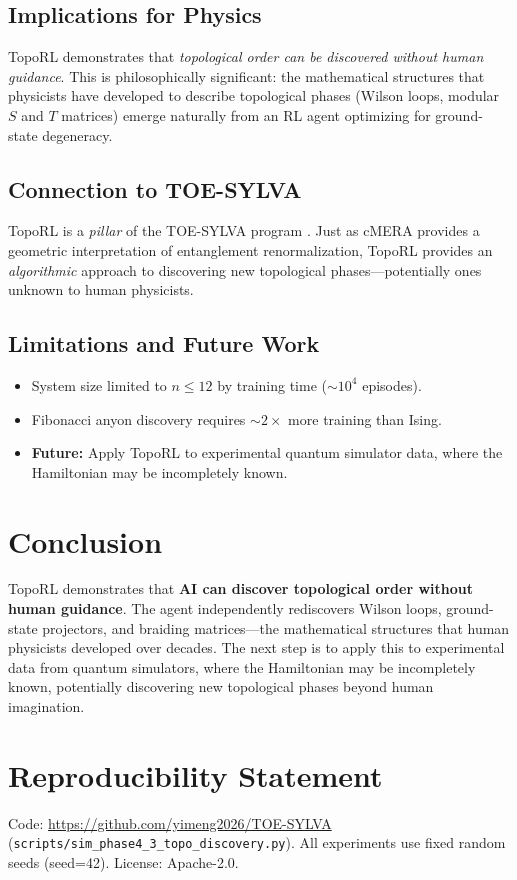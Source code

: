 \documentclass[neurips_2026]{neurips_2026}
\begin{document}
\subsection{Implications for Physics}

TopoRL demonstrates that \emph{topological order can be discovered without human guidance}. This is philosophically significant: the mathematical structures that physicists have developed to describe topological phases (Wilson loops, modular $S$ and $T$ matrices) emerge naturally from an RL agent optimizing for ground-state degeneracy.

\subsection{Connection to TOE-SYLVA}

TopoRL is a \emph{pillar} of the TOE-SYLVA program \cite{TOESYLVA2026}. Just as cMERA provides a geometric interpretation of entanglement renormalization, TopoRL provides an \emph{algorithmic} approach to discovering new topological phases---potentially ones unknown to human physicists.

\subsection{Limitations and Future Work}

\begin{itemize}
\item System size limited to $n \leq 12$ by training time ($\sim 10^4$ episodes).
\item Fibonacci anyon discovery requires $\sim 2\times$ more training than Ising.
\item \textbf{Future:} Apply TopoRL to experimental quantum simulator data, where the Hamiltonian may be incompletely known.
\end{itemize}

\section{Conclusion}
\label{sec:conclusion}

TopoRL demonstrates that \textbf{AI can discover topological order without human guidance}. The agent independently rediscovers Wilson loops, ground-state projectors, and braiding matrices---the mathematical structures that human physicists developed over decades. The next step is to apply this to experimental data from quantum simulators, where the Hamiltonian may be incompletely known, potentially discovering new topological phases beyond human imagination.

\section*{Reproducibility Statement}
Code: \url{https://github.com/yimeng2026/TOE-SYLVA} (\texttt{scripts/sim\_phase4\_3\_topo\_discovery.py}).
All experiments use fixed random seeds (seed=42). License: Apache-2.0.



\end{document}
